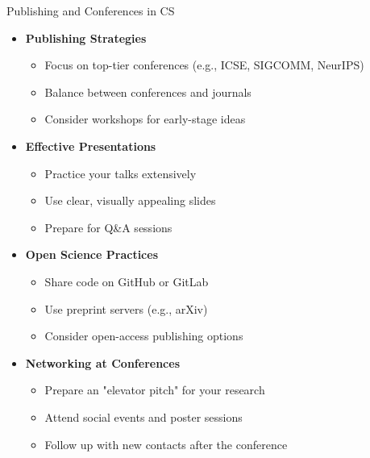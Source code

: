 \documentclass[aspectratio=169,10pt]{beamer}
\begin{document}
\begin{frame}{Publishing and Conferences in CS}
\begin{itemize}
    \item \textbf{Publishing Strategies}
    \begin{itemize}
        \item Focus on top-tier conferences (e.g., ICSE, SIGCOMM, NeurIPS)
        \item Balance between conferences and journals
        \item Consider workshops for early-stage ideas
    \end{itemize}
    \item \textbf{Effective Presentations}
    \begin{itemize}
        \item Practice your talks extensively
        \item Use clear, visually appealing slides
        \item Prepare for Q\&A sessions
    \end{itemize}
    \item \textbf{Open Science Practices}
    \begin{itemize}
        \item Share code on GitHub or GitLab
        \item Use preprint servers (e.g., arXiv)
        \item Consider open-access publishing options
    \end{itemize}
    \item \textbf{Networking at Conferences}
    \begin{itemize}
        \item Prepare an "elevator pitch" for your research
        \item Attend social events and poster sessions
        \item Follow up with new contacts after the conference
    \end{itemize}
\end{itemize}
\end{frame}
\end{document}
